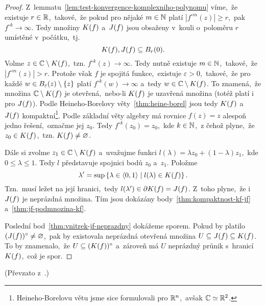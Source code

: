 \begin{proof}
    Z~lemmatu~\ref{lem:test-konvergence-komplexniho-polynomu} víme,~že existuje $r\in\mathbb{R}$,~takové,~že pokud pro nějaké $m\in\mathbb{N}$ platí $|f^{\circ m}(z)|\geqslant r$,~pak $f^{\circ k}\to\infty$. Tedy množiny $K(f)$ a~$J(f)$ jsou obsaženy v~kouli o~poloměru $r$ umístěné v~počátku,~tj.
    \[K(f),J(f)\subseteq B_r(0).\]
    Volme $z\in\mathbb{C}\setminus K(f)$,~tzn. $f^{\circ k}(z)\to\infty$. Tedy nutně existuje $m\in\mathbb{N}$,~takové,~že $|f^{\circ m}(z)|>r$. Protože však $f$ je spojitá funkce,~existuje $\varepsilon>0$,~takové,~že pro každé $w\in B_\varepsilon(z)\setminus\left\{z\right\}$ platí $f^{\circ k}(w)\to\infty$ a~tedy $w\in\mathbb{C}\setminus K(f)$. To znamená,~že množina $\mathbb{C}\setminus K(f)$ je otevřená,~nebo-li $K(f)$ je uzavřená množina (totéž platí i pro $J(f)$). Podle Heineho-Borelovy věty~\ref{thm:heine-borel} jsou tedy $K(f)$ a~$J(f)$ kompaktní\footnote{Heineho-Borelovu větu jsme sice formulovali pro $\mathbb{R}^n$,~avšak $\mathbb{C}\simeq\mathbb{R}^2$.}. Podle základní věty algebry má rovnice $f(z)=z$ alespoň jedno řešení,~označme jej $z_0$. Tedy $f^{\circ k}(z_0)=z_0$,~kde $k\in\mathbb{N}$,~z čehož plyne,~že $z_0\in K(f)$,~tzn. $K(f)\neq\varnothing$.
    
    Dále si zvolme $z_1\in\mathbb{C}\setminus K(f)$ a~uvažujme funkci $l(\lambda)=\lambda z_0+(1-\lambda)z_1$,~kde $0\leqslant\lambda\leqslant 1$. Tedy $l$ představuje spojnici bodů $z_0$ a~$z_1$. Položme
    \[\lambda^\prime=\sup\left\{\lambda\in\langle0,1\rangle\mid l(\lambda)\in K(f)\right\}.\]
    Tzn.~musí ležet na její hranici,~tedy $l(\lambda^\prime)\in\partial K(f)=J(f)$. Z~toho plyne,~že i~$J(f)$ je neprázdná množina. Tím jsou dokázány body~\ref{thm:kompaktnost-kf-jf} a~\ref{thm:jf-podmnozina-kf}.

    Poslední bod~\ref{thm:vnitrek-jf-neprazdny} dokážeme sporem. Pokud by platilo  $(J(f))^\circ\neq\varnothing$,~pak by existovala neprázdná otevřená množina $U\subseteq J(f)\subseteq K(f)$. To by znamenalo,~že $U\subseteq(K(f))^\circ$ a~zároveň má $U$ neprázdný průnik s~hranicí $K(f)$,~což je spor.
\end{proof}
(Převzato z~\citep[str. 237]{Falconer1989}.)


